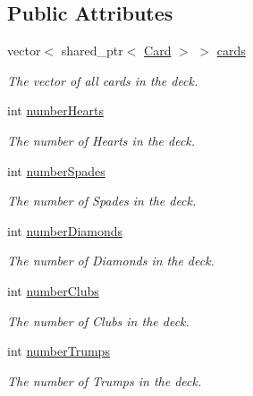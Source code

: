 \subsection*{\-Public \-Attributes}
\begin{DoxyCompactItemize}
\item 
\hypertarget{classDeck_a6b1a1cb4731888fe92e381dd74eb1e16}{vector$<$ shared\-\_\-ptr$<$ \hyperlink{classCard}{\-Card} $>$ $>$ \hyperlink{classDeck_a6b1a1cb4731888fe92e381dd74eb1e16}{cards}}\label{classDeck_a6b1a1cb4731888fe92e381dd74eb1e16}

\begin{DoxyCompactList}\small\item\em \-The vector of all cards in the deck. \end{DoxyCompactList}\item 
\hypertarget{classDeck_ac42ed01da688a430609cac03c00b2a5a}{int \hyperlink{classDeck_ac42ed01da688a430609cac03c00b2a5a}{number\-Hearts}}\label{classDeck_ac42ed01da688a430609cac03c00b2a5a}

\begin{DoxyCompactList}\small\item\em \-The number of \-Hearts in the deck. \end{DoxyCompactList}\item 
\hypertarget{classDeck_a3f3e1163d62a3e6136d2a1104b93f80d}{int \hyperlink{classDeck_a3f3e1163d62a3e6136d2a1104b93f80d}{number\-Spades}}\label{classDeck_a3f3e1163d62a3e6136d2a1104b93f80d}

\begin{DoxyCompactList}\small\item\em \-The number of \-Spades in the deck. \end{DoxyCompactList}\item 
\hypertarget{classDeck_ac36c6f248cf951b54580d6eba0734e3b}{int \hyperlink{classDeck_ac36c6f248cf951b54580d6eba0734e3b}{number\-Diamonds}}\label{classDeck_ac36c6f248cf951b54580d6eba0734e3b}

\begin{DoxyCompactList}\small\item\em \-The number of \-Diamonds in the deck. \end{DoxyCompactList}\item 
\hypertarget{classDeck_af3ff1d8bc6de0cc05a1fe64b5c70b38a}{int \hyperlink{classDeck_af3ff1d8bc6de0cc05a1fe64b5c70b38a}{number\-Clubs}}\label{classDeck_af3ff1d8bc6de0cc05a1fe64b5c70b38a}

\begin{DoxyCompactList}\small\item\em \-The number of \-Clubs in the deck. \end{DoxyCompactList}\item 
\hypertarget{classDeck_a7ddd8527b161887e1ae4023e371c1093}{int \hyperlink{classDeck_a7ddd8527b161887e1ae4023e371c1093}{number\-Trumps}}\label{classDeck_a7ddd8527b161887e1ae4023e371c1093}

\begin{DoxyCompactList}\small\item\em \-The number of \-Trumps in the deck. \end{DoxyCompactList}\end{DoxyCompactItemize}


